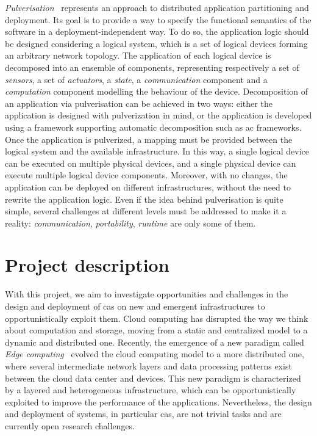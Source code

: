 \documentclass[12pt]{article}
\begin{document}
\emph{Pulverisation}~\cite{DBLP:journals/fi/CasadeiPPVW20} represents an approach to distributed application partitioning and deployment.
%
Its goal is to provide a way to specify the functional semantics of the software in a deployment-independent way.
%
To do so,
the application logic should be designed considering a logical system,
which is a set of logical devices forming an arbitrary network topology.
%
The application of each logical device is decomposed into an ensemble of components,
representing respectively a set of \emph{sensors},
a set of \emph{actuators},
a \emph{state},
a \emph{communication} component and a \emph{computation} component modelling the behaviour of the device.
%
Decomposition of an application via pulverisation can be achieved in two ways:
either the application is designed with pulverization in mind,
or the application is developed using a framework supporting automatic decomposition such as \ac{ac} frameworks.
%
Once the application is pulverized,
a mapping must be provided between the logical system and the available infrastructure.
%
In this way,
a single logical device can be executed on multiple physical devices,
and a single physical device can execute multiple logical device components.
%
Moreover,
with no changes,
the application can be deployed on different infrastructures,
without the need to rewrite the application logic.
%
Even if the idea behind pulverisation is quite simple,
several challenges at different levels must be addressed to make it a reality:
\emph{communication}, \emph{portability}, \emph{runtime} are only some of them.

\section{Project description}\label{sec:project-description}

With this project,
we aim to investigate opportunities and challenges in the design and deployment of
\ac{cas} on new and emergent infrastructures to opportunistically exploit them.
%
Cloud computing has disrupted the way we think about computation and storage,
moving from a static and centralized model to a dynamic and distributed one.
%
Recently,
the emergence of a new paradigm called \emph{Edge computing}~\cite{DBLP:journals/comsur/MaoYZHL17,DBLP:journals/access/YuLHHLLY18}
evolved the cloud computing model to a more distributed one,
where several intermediate network layers and data processing patterns exist between the cloud data center and devices.
%
This new paradigm is characterized by a layered and heterogeneous infrastructure,
which can be opportunistically exploited to improve the performance of the applications.
%
Nevertheless,
the design and deployment of systems, in particular \ac{cas},
are not trivial tasks and are currently open research challenges.
\end{document}
